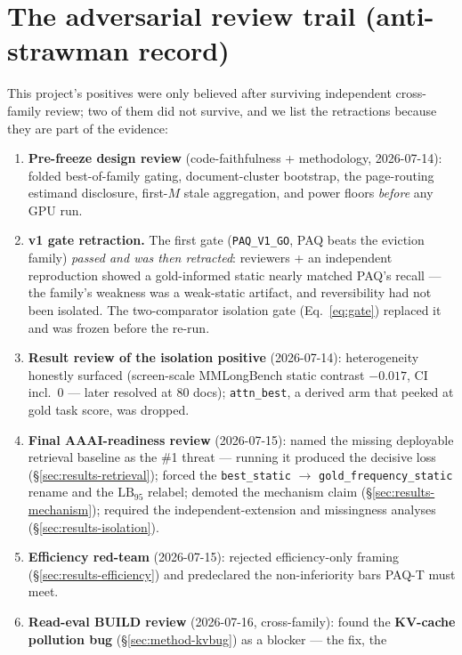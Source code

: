 \documentclass[11pt,letterpaper]{article}
\newcommand{\paq}{\textsc{PAQ}}
\newcommand{\paqt}{\textsc{PAQ-T}}
\newcommand{\lb}{\mathrm{LB}_{95}}
\begin{document}
\section{The adversarial review trail (anti-strawman record)}\label{app:reviews}
This project's positives were only believed after surviving independent cross-family review; two
of them did not survive, and we list the retractions because they are part of the evidence:
\begin{enumerate}
  \item \textbf{Pre-freeze design review} (code-faithfulness + methodology, 2026-07-14): folded
        best-of-family gating, document-cluster bootstrap, the page-routing estimand disclosure,
        first-$M$ stale aggregation, and power floors \emph{before} any GPU run.
  \item \textbf{v1 gate retraction.} The first gate (\texttt{PAQ\_V1\_GO}, \paq{} beats
        the eviction family) \emph{passed and was then retracted}: reviewers + an independent
        reproduction showed a gold-informed static nearly matched \paq's recall --- the family's
        weakness was a weak-static artifact, and reversibility had not been isolated. The
        two-comparator isolation gate (Eq.~\eqref{eq:gate}) replaced it and was frozen before
        the re-run.
  \item \textbf{Result review of the isolation positive} (2026-07-14): heterogeneity honestly
        surfaced (screen-scale MMLongBench static contrast $-0.017$, CI incl.\ 0 --- later
        resolved at 80 docs); \texttt{attn\_best}, a derived arm that peeked at gold task
        score, was dropped.
  \item \textbf{Final AAAI-readiness review} (2026-07-15): named the missing deployable retrieval
        baseline as the \#1 threat --- running it produced the decisive loss
        (\S\ref{sec:results-retrieval}); forced the \texttt{best\_static} $\to$
        \texttt{gold\_frequency\_static} rename and the $\lb$ relabel; demoted the mechanism
        claim (\S\ref{sec:results-mechanism}); required the independent-extension and
        missingness analyses (\S\ref{sec:results-isolation}).
  \item \textbf{Efficiency red-team} (2026-07-15): rejected efficiency-only framing
        (\S\ref{sec:results-efficiency}) and predeclared the non-inferiority bars \paqt{} must
        meet.
  \item \textbf{Read-eval BUILD review} (2026-07-16, cross-family): found the
        \textbf{KV-cache pollution bug} (\S\ref{sec:method-kvbug}) as a blocker --- the fix, the

\end{enumerate}
\end{document}
